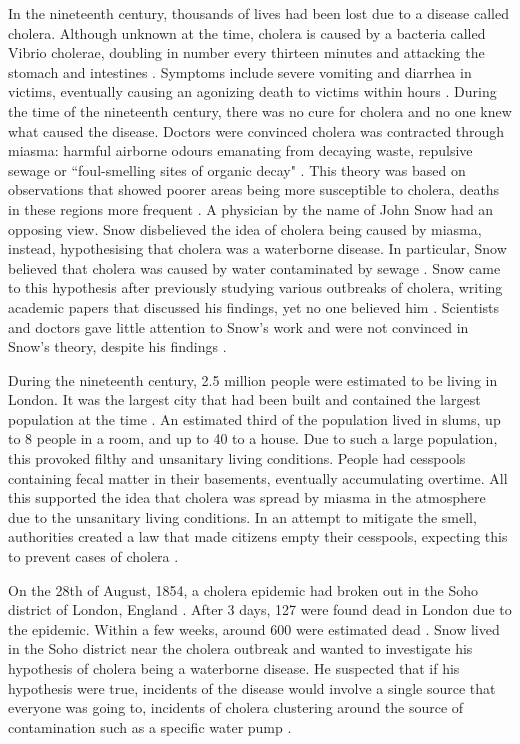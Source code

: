 \documentclass[12pt]{article}
\begin{document}
In the nineteenth century, thousands of lives had been lost due to a disease called cholera. Although unknown at the time, cholera is caused by a bacteria called Vibrio cholerae, doubling in number every thirteen minutes and attacking the stomach and intestines \cite{channel1}. Symptoms include severe vomiting and diarrhea in victims, eventually causing an agonizing death to victims within hours \cite{heros, channel1}. During the time of the nineteenth century, there was no cure for cholera and no one knew what caused the disease. Doctors were convinced cholera was contracted through miasma: harmful airborne odours emanating from decaying waste, repulsive sewage or ``foul-smelling sites of organic decay" \cite{ucla, test}. This theory was based on observations that showed poorer areas being more susceptible to cholera, deaths in these regions more frequent \cite{heros}. A physician by the name of John Snow had an opposing view. Snow disbelieved the idea of cholera being caused by miasma, instead, hypothesising that cholera was a waterborne disease. In particular, Snow believed that cholera was caused by water contaminated by sewage \cite{ucla}. Snow came to this hypothesis after previously studying various outbreaks of cholera, writing academic papers that discussed his findings, yet no one believed him \cite{original}. Scientists and doctors gave little attention to Snow's work and were not convinced in Snow's theory, despite his findings \cite{ucla}. 

During the nineteenth century, 2.5 million people were estimated to be living in London. It was the largest city that had been built and contained the largest population at the time \cite{channel1, tedtalk}. An estimated third of the population lived in slums, up to 8 people in a room, and up to 40 to a house. Due to such a large population, this provoked filthy and unsanitary living conditions. People had cesspools containing fecal matter in their basements, eventually accumulating overtime. All this supported the idea that cholera was spread by miasma in the atmosphere due to the unsanitary living conditions. In an attempt to mitigate the smell, authorities created a law that made citizens empty their cesspools, expecting this to prevent cases of cholera \cite{tedtalk, johnson}. 

On the 28th of August, 1854, a cholera epidemic had broken out in the Soho district of London, England \cite{tedtalk}. After 3 days, 127 were found dead in London due to the epidemic. Within a few weeks, around 600 were estimated dead \cite{youtube, tedtalk}. Snow lived in the Soho district near the cholera outbreak and wanted to investigate his hypothesis of cholera being a waterborne disease. He suspected that if his hypothesis were true, incidents of the disease would involve a single source that everyone was going to, incidents of cholera clustering around the source of contamination such as a specific water pump \cite{test, tedtalk, johnson}. 
\end{document}
